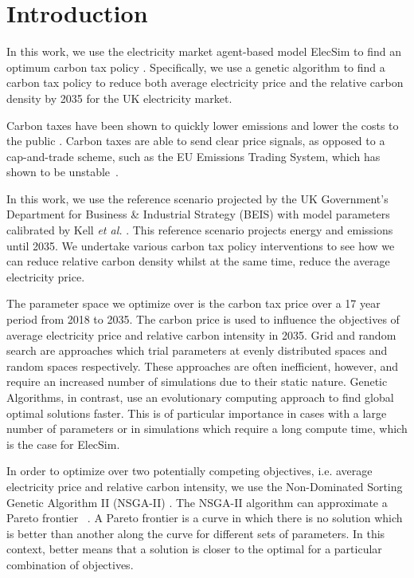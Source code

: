 \section{Introduction}
\label{carbonoptim:sec:intro}


In this work, we use the electricity market agent-based model ElecSim to find an optimum carbon tax policy \cite{Kell}. Specifically, we use a genetic algorithm to find a carbon tax policy to reduce both average electricity price and the relative carbon density by 2035 for the UK electricity market. 

Carbon taxes have been shown to quickly lower emissions and lower the costs to the public \cite{Wittneben2009}. Carbon taxes are able to send clear price signals, as opposed to a cap-and-trade scheme, such as the EU Emissions Trading System, which has shown to be unstable~\cite{Wittneben2009}.

In this work, we use the reference scenario projected by the UK Government's Department for Business \& Industrial Strategy (BEIS) with model parameters calibrated by Kell \textit{et al.} \cite{DBEIS2019,Kell2020}. This reference scenario projects energy and emissions until 2035. We undertake various carbon tax policy interventions to see how we can reduce relative carbon density whilst at the same time, reduce the average electricity price.


The parameter space we optimize over is the carbon tax price over a 17 year period from 2018 to 2035. The carbon price is used to influence the objectives of average electricity price and relative carbon intensity in 2035. Grid and random search are approaches which trial parameters at evenly distributed spaces and random spaces respectively. These approaches are often inefficient, however, and require an increased number of simulations due to their static nature. Genetic Algorithms, in contrast, use an evolutionary computing approach to find global optimal solutions faster. This is of particular importance in cases with a large number of parameters or in simulations which require a long compute time, which is the case for ElecSim.

In order to optimize over two potentially competing objectives, i.e. average electricity price and relative carbon intensity, we use the Non-Dominated Sorting Genetic Algorithm II (NSGA-II) \cite{Valkanas2014}. The NSGA-II algorithm can approximate a Pareto frontier ~\cite{Pareto1927, Stadler1979}. A Pareto frontier is a curve in which there is no solution which is better than another along the curve for different sets of parameters. In this context, better means that a solution is closer to the optimal for a particular combination of objectives.

